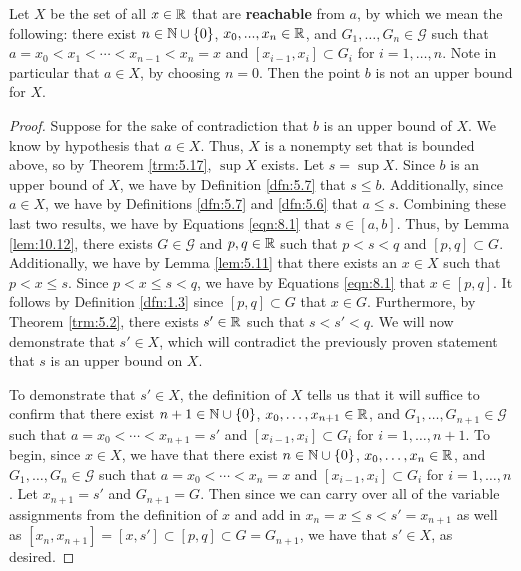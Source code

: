 \documentclass[../main.tex]{subfiles}
\begin{document}
\begin{lemma}\label{lem:10.13}
    Let $X$ be the set of all $x\in\mathbb{R}$ that are \textbf{reachable} from $a$, by which we mean the following: there exist $n\in\mathbb{N}\cup\{0\}$, $x_0,...,x_n\in\mathbb{R}$, and $G_1,\dots,G_n\in\mathcal{G}$ such that $a=x_0<x_1<\cdots<x_{n-1}<x_n=x$ and $[x_{i-1},x_i]\subset G_i$ for $i=1,\dots,n$. Note in particular that $a\in X$, by choosing $n=0$. Then the point $b$ is not an upper bound for $X$.
    \begin{proof}
        Suppose for the sake of contradiction that $b$ is an upper bound of $X$. We know by hypothesis that $a\in X$. Thus, $X$ is a nonempty set that is bounded above, so by Theorem \ref{trm:5.17}, $\sup X$ exists. Let $s=\sup X$. Since $b$ is an upper bound of $X$, we have by Definition \ref{dfn:5.7} that $s\leq b$. Additionally, since $a\in X$, we have by Definitions \ref{dfn:5.7} and \ref{dfn:5.6} that $a\leq s$. Combining these last two results, we have by Equations \ref{eqn:8.1} that $s\in[a,b]$. Thus, by Lemma \ref{lem:10.12}, there exists $G\in\mathcal{G}$ and $p,q\in\mathbb{R}$ such that $p<s<q$ and $[p,q]\subset G$. Additionally, we have by Lemma \ref{lem:5.11} that there exists an $x\in X$ such that $p<x\leq s$. Since $p<x\leq s<q$, we have by Equations \ref{eqn:8.1} that $x\in[p,q]$. It follows by Definition \ref{dfn:1.3} since $[p,q]\subset G$ that $x\in G$. Furthermore, by Theorem \ref{trm:5.2}, there exists $s'\in\mathbb{R}$ such that $s<s'<q$. We will now demonstrate that $s'\in X$, which will contradict the previously proven statement that $s$ is an upper bound on $X$.\par
        To demonstrate that $s'\in X$, the definition of $X$ tells us that it will suffice to confirm that there exist $n+1\in\mathbb{N}\cup\{0\}$, $x_0,\dots,x_{n+1}\in\mathbb{R}$, and $G_1,\dots,G_{n+1}\in\mathcal{G}$ such that $a=x_0<\cdots<x_{n+1}=s'$ and $[x_{i-1},x_i]\subset G_i$ for $i=1,\dots,n+1$. To begin, since $x\in X$, we have that there exist $n\in\mathbb{N}\cup\{0\}$, $x_0,\dots,x_n\in\mathbb{R}$, and $G_1,\dots,G_n\in\mathcal{G}$ such that $a=x_0<\cdots<x_n=x$ and $[x_{i-1},x_i]\subset G_i$ for $i=1,\dots,n$. Let $x_{n+1}=s'$ and $G_{n+1}=G$. Then since we can carry over all of the variable assignments from the definition of $x$ and add in $x_n=x\leq s<s'=x_{n+1}$ as well as $[x_n,x_{n+1}]=[x,s']\subset[p,q]\subset G=G_{n+1}$, we have that $s'\in X$, as desired.
    \end{proof}
\end{lemma}
\end{document}
